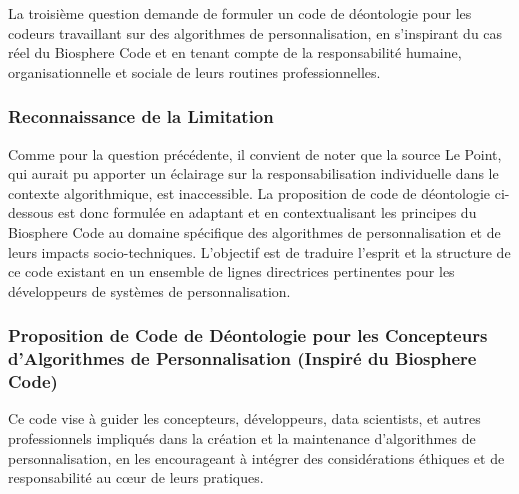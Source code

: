 \documentclass[10pt, twocolumn]{article}
\begin{document}
La troisième question demande de formuler un code de déontologie pour les codeurs travaillant sur des algorithmes de personnalisation, en s'inspirant du cas réel du Biosphere Code et en tenant compte de la responsabilité humaine, organisationnelle et sociale de leurs routines professionnelles.

\subsubsection{Reconnaissance de la Limitation}
Comme pour la question précédente, il convient de noter que la source Le Point, qui aurait pu apporter un éclairage sur la responsabilisation individuelle dans le contexte algorithmique, est inaccessible. La proposition de code de déontologie ci-dessous est donc formulée en adaptant et en contextualisant les principes du Biosphere Code \citep{Biosphere2015} au domaine spécifique des algorithmes de personnalisation et de leurs impacts socio-techniques. L'objectif est de traduire l'esprit et la structure de ce code existant en un ensemble de lignes directrices pertinentes pour les développeurs de systèmes de personnalisation.

\subsubsection{Proposition de Code de Déontologie pour les Concepteurs d'Algorithmes de Personnalisation (Inspiré du Biosphere Code)}

Ce code vise à guider les concepteurs, développeurs, data scientists, et autres professionnels impliqués dans la création et la maintenance d'algorithmes de personnalisation, en les encourageant à intégrer des considérations éthiques et de responsabilité au cœur de leurs pratiques.
\end{document}
